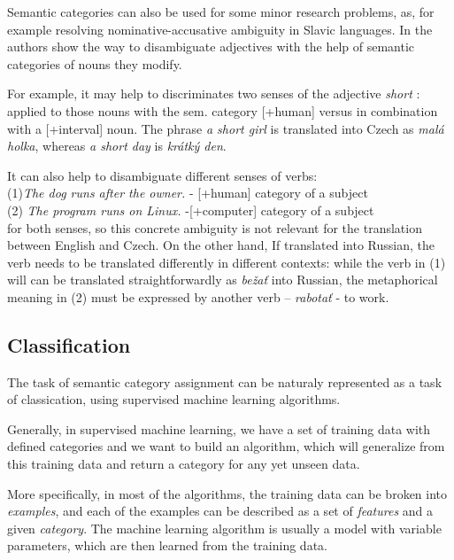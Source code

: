 \documentclass[letterpaper]{article}
\newcommand{\todofn}[1] {
 \footnote{\textbf{TODO : #1}}}
\begin{document}
Semantic categories can also be used for some minor research problems, as, for example
resolving nominative-accusative ambiguity in Slavic languages.
In \cite{principled_disam} the authors show the way to disambiguate adjectives
with the help of semantic categories of nouns they modify. 

For example, it may help 
to discriminates two senses of the  adjective \textit{short}
: applied to those nouns with the sem. category [+human] versus in combination
with a [+interval] noun. The phrase \textit{a short girl} is translated
into Czech as \textit{mal\'{a} holka}, whereas \textit{a short day} is \textit{kr\'{a}tk\'{y} den}.

It can also help to disambiguate different senses of verbs:\\ 
(1)\textit{The dog runs after the owner.} - [+human] category of a subject\\
(2) \textit{The program runs on Linux.} -[+computer] category of a subject \\
for both senses, so this concrete ambiguity is not relevant for
the translation between English and Czech. On the other hand, 
If translated into Russian, the verb needs to be translated differently in different contexts: 
while the verb in (1) will can be translated straightforwardly as \textit{be\v{z}a\v{t}} into Russian,
the metaphorical meaning in (2) must be expressed by another verb -- \textit{rabota\v{t}} - to work.

\subsection{Classification}
The task of semantic category assignment can be naturaly represented as a task of classication, using supervised machine learning algorithms.

Generally, in supervised machine learning, we have a set of training data with defined 
categories and we want to build an algorithm, which will generalize from this training data and return a category for any yet unseen data.

More specifically, in most of the algorithms, the training data can be broken into
\textit{examples}, and each of the examples can be described as a set of \textit{features} and a given \textit{category}. The machine learning algorithm is usually a model with variable parameters, which are then learned from the training data.
\end{document}
